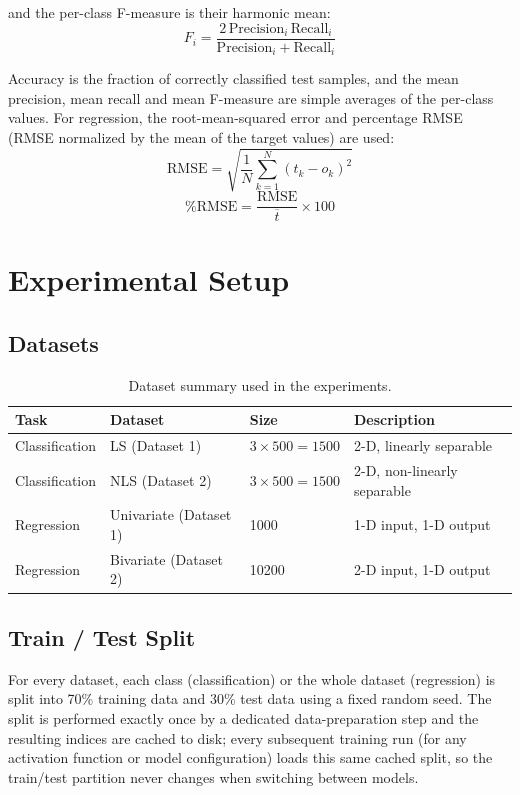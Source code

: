 \documentclass[11pt,a4paper]{article}
\begin{document}
and the per-class F-measure is their harmonic mean:
\[
F_i = \frac{2\,\mathrm{Precision}_i\,\mathrm{Recall}_i}{\mathrm{Precision}_i+\mathrm{Recall}_i}
\]

Accuracy is the fraction of correctly classified test samples, and the mean precision, mean recall and mean F-measure are simple averages of the per-class values. For regression, the root-mean-squared error and percentage RMSE (RMSE normalized by the mean of the target values) are used:
\[
\mathrm{RMSE} = \sqrt{\frac{1}{N}\sum_{k=1}^{N}(t_k-o_k)^2}
\]
\[
\%\mathrm{RMSE} = \frac{\mathrm{RMSE}}{\overline{t}}\times 100
\]
\clearpage

\section{Experimental Setup}
\subsection{Datasets}
\begin{table}[H]
\centering
\renewcommand{\arraystretch}{1.3}
\begin{tabular}{|p{}|p{}|p{}|p{}|}
\hline
\rowcolor{blue!60}\color{white}\textbf{Task} & \color{white}\textbf{Dataset} & \color{white}\textbf{Size} & \color{white}\textbf{Description} \\
\hline
Classification & LS (Dataset 1) & $3\times500=1500$ & 2-D, linearly separable \\
\hline
Classification & NLS (Dataset 2) & $3\times500=1500$ & 2-D, non-linearly separable \\
\hline
Regression & Univariate (Dataset 1) & 1000 & 1-D input, 1-D output \\
\hline
Regression & Bivariate (Dataset 2) & 10200 & 2-D input, 1-D output \\
\hline
\end{tabular}
\caption*{Dataset summary used in the experiments.}
\end{table}

\subsection{Train / Test Split}
For every dataset, each class (classification) or the whole dataset (regression) is split into 70\% training data and 30\% test data using a fixed random seed. The split is performed exactly once by a dedicated data-preparation step and the resulting indices are cached to disk; every subsequent training run (for any activation function or model configuration) loads this same cached split, so the train/test partition never changes when switching between models.
\end{document}
